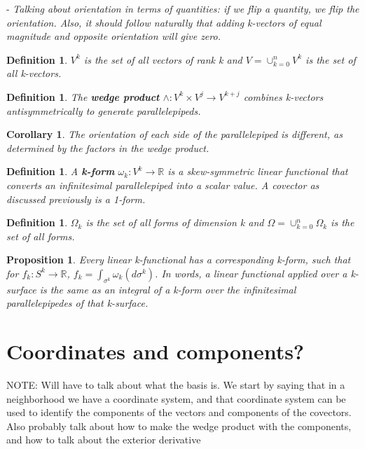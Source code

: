 \documentclass{book}
\newtheorem{defn}[equation]{Definition}
\newtheorem{coro}[equation]{Corollary}
\newtheorem{prop}[equation]{Proposition}
\begin{document}
- \emph{Talking about orientation in terms of quantities: if we flip a quantity, we flip the orientation. Also, it should follow naturally that adding k-vectors of equal magnitude and opposite orientation will give zero.}



\begin{defn}
	$V^k$ is the set of all vectors of rank k and $V = \cup_{k=0}^n V^k$ is the set of all k-vectors. 
	\end{defn}



\begin{defn}
	
	The \textbf{wedge product} $\wedge : V^k\times V^j \to V^{k+j}$ combines k-vectors antisymmetrically to generate parallelepipeds. 
\end{defn}

\begin{coro}
	The orientation of each side of the parallelepiped is different, as determined by the factors in the wedge product. 
\end{coro}

\begin{defn}
	A \textbf{k-form} $\omega_k : V^k \to \mathbb{R}$ is a skew-symmetric linear functional that converts an infinitesimal parallelepiped into a scalar value. A covector as discussed previously is a 1-form. 
\end{defn}

\begin{defn}
	$\Omega_k$ is the set of all forms of dimension k and $\Omega = \cup_{k=0}^n\Omega_k$ is the set of all forms. 
\end{defn}

\begin{prop}
	Every linear k-functional has a corresponding k-form, such that for $f_k : S^k \to \mathbb{R}$, $f_k = \int_{\sigma^k} \omega_k(d\sigma^k)$. In words, a linear functional applied over a k-surface is the same as an integral of a k-form over the infinitesimal parallelepipedes of that k-surface. 
\end{prop}

\section{Coordinates and components?}

NOTE: Will have to talk about what the basis is. We start by saying that in a neighborhood we have a coordinate system, and that coordinate system can be used to identify the components of the vectors and components of the covectors. Also probably talk about how to make the wedge product with the components, and how to talk about the exterior derivative
\end{document}
